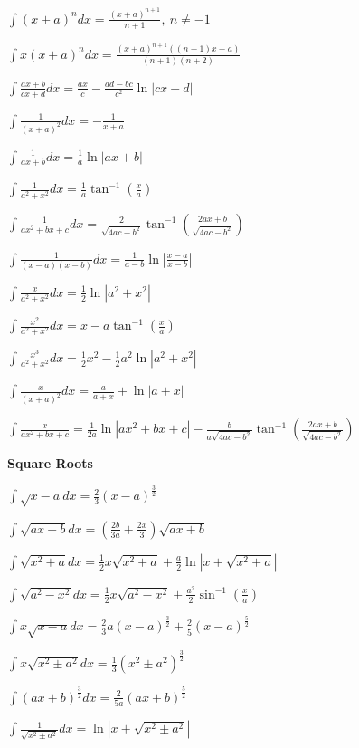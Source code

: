 \documentclass[8pt,a4paper]{extarticle}     %
\theoremstyle{definition}
\theoremstyle{definition}
\theoremstyle{definition}
\begin{document}
\begin{multicols}{4}
\begin{bulletlist}
	\item $\int (x+a)^n dx=\frac{(x+a)^{n+1}}{n+1}, \ n\neq-1$
	\item $\int x(x+a)^n dx=\frac{(x+a)^{n+1}((n+1)x-a)}{(n+1)(n+2)}$
	\item $\int \frac{ax+b}{cx+d}dx = \frac{ax}{c}-\frac{ad-bc}{c^2}\ln|cx+d|$
	\item $\int \frac{1}{(x+a)^2}dx = -\frac{1}{x+a}$
	\item $\int \frac{1}{ax+b}dx = \frac{1}{a}\ln|ax+b|$
	\item $\int \frac{1}{a^2+x^2}dx = \frac{1}{a}\tan^{-1}\left(\frac{x}{a}\right)$
	\item $\int \frac{1}{ax^2+bx+c}dx = \frac{2}{\sqrt{4ac-b^2}}\tan^{-1}\left(\frac{2ax+b}{\sqrt{4ac-b^2}}\right)$
	\item $\int \frac{1}{(x-a)(x-b)}dx = \frac{1}{a-b}\ln\left|\frac{x-a}{x-b}\right|$
	\item $\int \frac{x}{a^2+x^2}dx = \frac{1}{2}\ln\left|a^2+x^2\right|$
	\item $\int \frac{x^2}{a^2+x^2}dx = x-a\tan^{-1}\left(\frac{x}{a}\right)$
	\item $\int \frac{x^3}{a^2+x^2}dx = \frac{1}{2}x^2-\frac{1}{2}a^2\ln\left|a^2+x^2\right|$
	\item $\int \frac{x}{(x+a)^2}dx = \frac{a}{a+x}+ \ln\left|a+x\right|$
	\item $\int \frac{x}{ax^2+bx+c} = \frac{1}{2a}\ln\left|ax^2+bx+c\right|-\frac{b}{a\sqrt{4ac-b^2}}\tan^{-1}\left(\frac{2ax+b}{\sqrt{4ac-b^2}}\right)$
	\item [] \textbf{Square Roots}
	\item $\int \sqrt{x-a}dx = \frac{2}{3}(x-a)^{\frac{3}{2}}$
	\item $\int \sqrt{ax+b}dx = \left(\frac{2b}{3a}+\frac{2x}{3}\right)\sqrt{ax+b}$
	\item $\int \sqrt{x^2+a}dx = \frac{1}{2}x\sqrt{x^2+a}+\frac{a}{2}\ln|x+\sqrt{x^2+a}|$
	\item $\int \sqrt{a^2-x^2}dx = \frac{1}{2}x\sqrt{a^2-x^2}+\frac{a^2}{2}\sin^{-1}\left(\frac{x}{a}\right)$
	\item $\int x\sqrt{x-a}dx = \frac{2}{3}a(x-a)^{\frac{3}{2}}+\frac{2}{5}(x-a)^{\frac{5}{2}}$
	\item $\int x\sqrt{x^2 \pm a^2}dx = \frac{1}{3}(x^2 \pm a^2)^{\frac{3}{2}}$
	\item $\int (ax+b)^{\frac{3}{2}}dx = \frac{2}{5a}(ax+b)^{\frac{5}{2}}$
	\item $\int \frac{1}{\sqrt{x^2 \pm a^2}}dx = \ln\left|x+\sqrt{x^2 \pm a^2}\right|$

\end{bulletlist}
\end{multicols}
\end{document}

